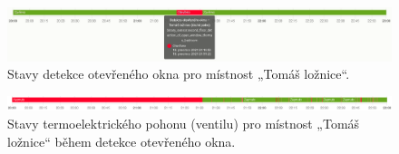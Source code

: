\begin{figure}[H]
    \centering
    \includegraphics[width=\textwidth]{images/testovani/detekce-otevreneho-okna/detekce-otevreneho-okna.png}
    \caption{Stavy detekce otevřeného okna pro místnost „Tomáš ložnice“.}
    \label{fig:detekce-otevreneho-okna}
\end{figure}

\begin{figure}[H]
    \centering
    \includegraphics[width=\textwidth]{images/testovani/detekce-otevreneho-okna/detekce-otevreneho-okna-ventil.png}
    \caption{Stavy termoelektrického pohonu (ventilu) pro místnost „Tomáš ložnice“ během detekce otevřeného okna.}
    \label{fig:detekce-otevreneho-okna-ventil}
\end{figure}



